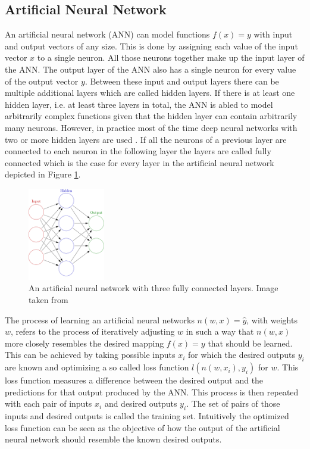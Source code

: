 \subsection{Artificial Neural Network}

An artificial neural network (ANN) can model functions $f(x) = y$ with input and output vectors of any size.
This is done by assigning each value of the input vector $x$ to a single neuron. All those neurons together make
up the input layer of the ANN. The output layer of the ANN also has a single neuron for every value of the
output vector $y$. Between these input and output layers there can be multiple additional layers which are called
hidden layers. If there is at least one hidden layer, i.e. at least three layers in total, the ANN is abled to 
model arbitrarily complex functions given that the hidden layer can contain arbitrarily many neurons.
However, in practice most of the time
deep neural networks with two or more hidden layers are used \parencite{2017-geron-homl}. 
If all the neurons of a previous layer are connected to each neuron in the following layer the layers are
called fully connected which is the case for every layer in the artificial neural network depicted
in Figure \ref{figure_fully_connected_nn}.

\begin{figure}[ht] 
    \centering
    \includegraphics[width=0.3\textwidth]{images/figures/artificial_neural_network.png}
    \caption{An artificial neural network with three fully connected layers.
    Image taken from \parencite{2013-glosser-ann}} \label{figure_fully_connected_nn}
\end{figure} 

The process of learning an artificial neural networks $n(w, x)=\hat{y}$, with weights $w$, refers to the process
of iteratively adjusting $w$ in such a way that $n(w, x )$ more closely resembles the desired mapping  $f(x)=y$
that should be learned. This can be achieved by taking possible inputs $x_{i}$ for which the 
desired outputs $y_{i}$ are known and optimizing a so called loss function $l(n(w,x_{i}),y_{i})$ for $w$.
This loss function measures a difference between the desired output and the predictions for that output produced
by the ANN.
This process is then repeated with each pair of inputs $x_{i}$ and desired outputs $y_{i}$. The set of pairs of
those inputs and desired outputs is called the training set. 
Intuitively the optimized loss function can be seen as the objective of how the output of the artificial neural
network should resemble the known desired outputs.


